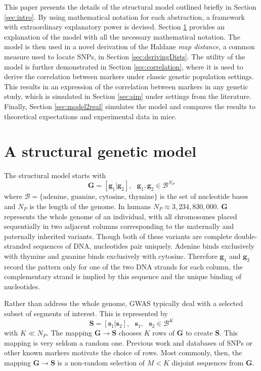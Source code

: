 \documentclass[sts]{imsart}
\newcommand{\ve}[1]{\mathbf{#1}}           %
\newcommand{\m}[1]{\mathbf{#1}}               %
\begin{document}
This paper presents the details of the structural model outlined briefly in Section \ref{sec:intro}. By using mathematical notation for each abstraction, a framework with extraordinary explanatory power is devised. Section \ref{sec:theModel} provides an explanation of the model with all the necessary mathematical notation. The model is then used in a novel derivation of the Haldane \emph{map distance}, a common measure used to locate SNPs, in Section \ref{sec:derivingDists}. The utility of the model is further demonstrated in Section \ref{sec:correlation}, where it is used to derive the correlation between markers under classic genetic population settings. This results in an expression of the correlation between markers in any genetic study, which is simulated in Section \ref{sec:sim} under settings from the literature. Finally, Section \ref{sec:model2real} simulates the model and compares the results to theoretical expectations and experimental data in mice.


\section{A structural genetic model} \label{sec:theModel}

The structural model starts with
$$\m{G} = [\ve{g}_1| \ve{g}_2], \text{ } \ve{g}_1, \ve{g}_2 \in \mathcal{B}^{N_P}$$
where $\mathcal{B} = \{\text{adenine, guanine, cytosine, thymine}\}$ is the set of nucleotide bases and $N_P$ is the length of the genome. In humans $N_P \approx 3,234,830,000$. $\m{G}$ represents the whole genome of an individual, with all chromosomes placed sequentially in two adjacent columns corresponding to the maternally and paternally inherited variants. Though both of these variants are complete double-stranded sequences of DNA, nucleotides pair uniquely. Adenine binds exclusively with thymine and guanine binds exclusively with cytosine. Therefore $\ve{g}_1$ and $\ve{g}_2$ record the pattern only for one of the two DNA strands for each column, the complementary strand is implied by this sequence and the unique binding of nucleotides.

Rather than address the whole genome, GWAS typically deal with a selected subset of segments of interest. This is represented by
$$\m{S} = [\ve{s}_1 | \ve{s}_2], \text{ } \ve{s}_1, \text{ } \ve{s}_2 \in \mathcal{B}^K$$
with $K \ll N_P$. The mapping $\m{G} \rightarrow \m{S}$ chooses $K$ rows of $\m{G}$ to create $\m{S}$. This mapping is very seldom a random one. Previous work and databases of SNPs or other known markers motivate the choice of rows. Most commonly, then, the mapping $\m{G} \rightarrow \m{S}$ is a non-random selection of $M < K$ disjoint sequences from $\m{G}$.
\end{document}
